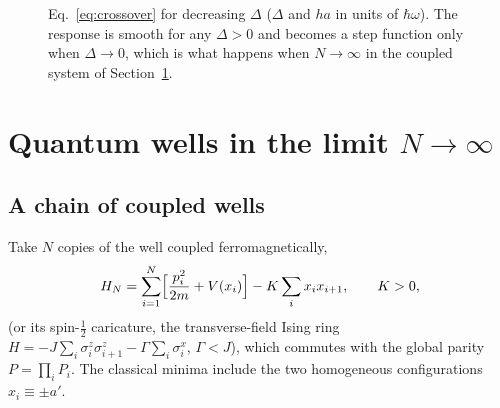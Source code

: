 \documentclass[11pt,a4paper]{article}
\theoremstyle{definition}
\theoremstyle{remark}
\newcommand{\hb}{\hbar}
\newcommand{\ev}[1]{\langle #1\rangle}
\begin{document}
\begin{figure}[t]
\centering
{}
\caption{Eq.~\eqref{eq:crossover} for decreasing $\Delta$ ($\Delta$ and $ha$ in units of $\hb\omega$). The
response is smooth for any $\Delta>0$ and becomes a step function only when $\Delta\to0$, which is what
happens when $N\to\infty$ in the coupled system of Section~\ref{sec:coupled}.}
\label{fig:cross}
\end{figure}

\section{Quantum wells in the limit \texorpdfstring{$N\to\infty$}{N to infinity}}\label{sec:coupled}

\subsection{A chain of coupled wells}

Take $N$ copies of the well coupled ferromagnetically,
\begin{equation}
H_N=\sum_{i=1}^N\Bigl[\frac{p_i^2}{2m}+V(x_i)\Bigr]-K\sum_{i}x_ix_{i+1},\qquad K>0,
\end{equation}
(or its spin-$\tfrac12$ caricature, the transverse-field Ising ring
$H=-J\sum_i\sigma^z_i\sigma^z_{i+1}-\Gamma\sum_i\sigma^x_i$, $\Gamma<J$), which commutes with the global
parity $P=\prod_iP_i$. The classical minima include the two homogeneous configurations $x_i\equiv\pm a'$.
\end{document}
